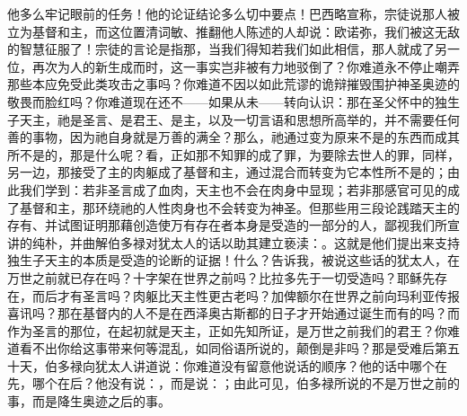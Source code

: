 他多么牢记眼前的任务！他的论证结论多么切中要点！巴西略宣称，宗徒说那人被立为基督和主，而这位置清词敏、推翻他人陈述的人却说：欧诺弥，我们被这无敌的智慧征服了！宗徒的言论是指那，当我们得知若我们如此相信，那人就成了另一位，再次为人的新生成而时，这一事实岂非被有力地驳倒了？你难道永不停止嘲弄那些本应免受此类攻击之事吗？你难道不因以如此荒谬的诡辩摧毁围护神圣奥迹的敬畏而脸红吗？你难道现在还不——如果从未——转向认识：那在圣父怀中的独生子天主，祂是圣言、是君王、是主，以及一切言语和思想所高举的，并不需要任何善的事物，因为祂自身就是万善的满全？那么，祂通过变为原来不是的东西而成其所不是的，那是什么呢？看，正如那不知罪的成了罪，为要除去世人的罪，同样，另一边，那接受了主的肉躯成了基督和主，通过混合而转变为它本性所不是的；由此我们学到：若非圣言成了血肉，天主也不会在肉身中显现；若非那感官可见的成了基督和主，那环绕祂的人性肉身也不会转变为神圣。但那些用三段论践踏天主的存有、并试图证明那藉创造使万有存在者本身是受造的一部分的人，鄙视我们所宣讲的纯朴，并曲解伯多禄对犹太人的话以助其建立亵渎：。这就是他们提出来支持独生子天主的本质是受造的论断的证据！什么？告诉我，被说这些话的犹太人，在万世之前就已存在吗？十字架在世界之前吗？比拉多先于一切受造吗？耶稣先存在，而后才有圣言吗？肉躯比天主性更古老吗？加俾额尔在世界之前向玛利亚传报喜讯吗？那在基督内的人不是在西泽奥古斯都的日子才开始通过诞生而有的吗？而作为圣言的那位，在起初就是天主，正如先知所证，是万世之前我们的君王？你难道看不出你给这事带来何等混乱，如同俗语所说的，颠倒是非吗？那是受难后第五十天，伯多禄向犹太人讲道说：你难道没有留意他说话的顺序？他的话中哪个在先，哪个在后？他没有说：，而是说：；由此可见，伯多禄所说的不是万世之前的事，而是降生奥迹之后的事。\par

